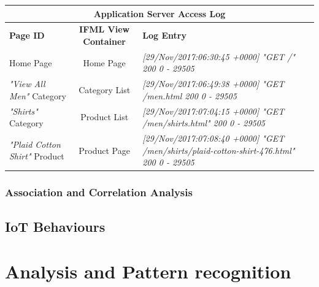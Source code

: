 \begin{center}
  \begin{tabular}{|l|c|p{6cm}|}
  \hline
  \multicolumn{3}{|c|}{Application Server Access Log}\\ \hline
  \textbf{Page ID}&\textbf{IFML View Container}&\textbf{Log Entry}   \\ \hline
  Home Page&Home Page&\em[29/Nov/2017:06:30:45 +0000] "GET /" 200 0 - 29505 \\ \hline
  \textit{"View All Men"} Category&Category List&\em[29/Nov/2017:06:49:38 +0000] "GET /men.html 200 0 - 29505 
  \\ \hline
  \textit{"Shirts"} Category &Product List&\em[29/Nov/2017:07:04:15 +0000] "GET /men/shirts.html" 200 0 - 29505
  \\ \hline
  \textit{"Plaid Cotton Shirt"} Product &Product Page&\em[29/Nov/2017:07:08:40 +0000] "GET /men/shirts/plaid-cotton-shirt-476.html" 200 0 - 29505
  \\ \hline
  \end{tabular}
  \end{center}






\subsubsection{Association and Correlation Analysis}




\subsection{IoT Behaviours}






\section{Analysis and Pattern recognition}



